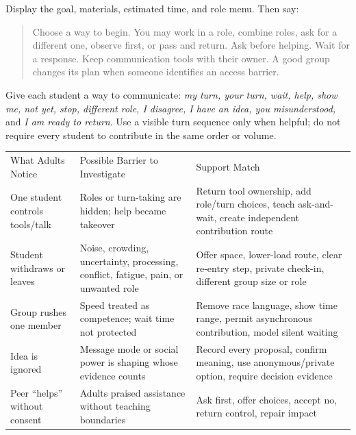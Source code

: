 Display the goal, materials, estimated time, and role menu. Then say:

\begin{quote}
Choose a way to begin. You may work in a role, combine roles, ask for a different one, observe first, or pass and return. Ask before helping. Wait for a response. Keep communication tools with their owner. A good group changes its plan when someone identifies an access barrier.
\end{quote}

Give each student a way to communicate: \textit{my turn, your turn, wait, help, show me, not yet, stop, different role, I disagree, I have an idea, you misunderstood,} and \textit{I am ready to return}. Use a visible turn sequence only when helpful; do not require every student to contribute in the same order or volume.


\setlength{\tabcolsep}{4pt}
\begin{tabularx}{\textwidth}{>{\RaggedRight\arraybackslash}p{1.35in} >{\RaggedRight\arraybackslash}p{2.25in} >{\RaggedRight\arraybackslash}X}
\rowcolor{PrimaryRed}
\color{white}What Adults Notice & \color{white}Possible Barrier to Investigate & \color{white}Support Match \\
One student controls tools/talk & Roles or turn-taking are hidden; help became takeover & Return tool ownership, add role/turn choices, teach ask-and-wait, create independent contribution route \\
\rowcolor{SoftGray}
Student withdraws or leaves & Noise, crowding, uncertainty, processing, conflict, fatigue, pain, or unwanted role & Offer space, lower-load route, clear re-entry step, private check-in, different group size or role \\
Group rushes one member & Speed treated as competence; wait time not protected & Remove race language, show time range, permit asynchronous contribution, model silent waiting \\
\rowcolor{SoftGray}
Idea is ignored & Message mode or social power is shaping whose evidence counts & Record every proposal, confirm meaning, use anonymous/private option, require decision evidence \\
Peer ``helps'' without consent & Adults praised assistance without teaching boundaries & Ask first, offer choices, accept no, return control, repair impact \\
\end{tabularx}

